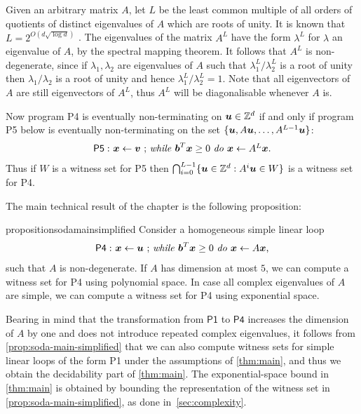 Given an arbitrary matrix $A$, let $L$ be the least common multiple of all orders of quotients of distinct eigenvalues of $A$ which are roots
of unity. It is known that $L=2^{O(d\sqrt{\log d})}$ \cite{BOOK}.  The
eigenvalues of the matrix $A^L$ have the form $\lambda^L$ for
$\lambda$ an eigenvalue of $A$, by the spectral mapping theorem.  It follows that
$A^L$ is non-degenerate, since if $\lambda_1,\lambda_2$ are
eigenvalues of $A$ such that $\lambda^L_1/\lambda^L_2$ is a root of
unity then $\lambda_1/\lambda_2$ is a root of unity and hence
$\lambda^L_1/\lambda^L_2=1$. Note that all eigenvectors of $A$ are still eigenvectors of $A^L$, thus $A^L$ will be diagonalisable whenever $A$ is.

Now program \textsf{P4} is eventually non-terminating on
$\boldsymbol{u}\in \mathbb{Z}^{d}$ if and only if program \textsf{P5}
below is eventually non-terminating on the set
$\{\boldsymbol{u},A\boldsymbol{u}, \ldots,A^{L-1}\boldsymbol{u}\}$:
\begin{gather*}
\mathsf{P5:}\ \mbox{$\boldsymbol{x}\gets \boldsymbol{v}$ ;
\textit{while} $\boldsymbol b^T\boldsymbol{x} \geq 0$ \textit{do} $\boldsymbol{x}\leftarrow A^L\boldsymbol{x}$.}
\end{gather*}
Thus if $W$ is a witness set for \textsf{P5} then $\bigcap_{i=0}^{L-1}
\{ \boldsymbol{u} \in \mathbb{Z}^{d} : A^i\boldsymbol{u} \in W\}$ is a witness set for
\textsf{P4}.

The main technical result of the chapter is the following proposition:
\begin{restatable}{proposition}{sodamainsimplified}
\label{prop:soda-main-simplified}
Consider a homogeneous simple linear loop
\begin{gather*}
\mathsf{P4:}\ \mbox{$\boldsymbol{x}\gets \boldsymbol{u}$ ;
\textit{while} $\boldsymbol{b}^T\boldsymbol{x} \geq 0$ \textit{do} $\boldsymbol{x}\leftarrow A\boldsymbol{x}$,}
\end{gather*}
such that $A$ is non-degenerate. If $A$ has dimension at most $5$, we can compute a witness set for \textsf{P4} using polynomial space.
In case all complex eigenvalues of $A$ are simple, we can compute a witness set for \textsf{P4} using exponential space.
\end{restatable}

Bearing in mind that the transformation from $\mathsf{P1}$ to
$\mathsf{P4}$ increases the dimension of $A$ by one and does not
introduce repeated complex eigenvalues, it follows from
\cref{prop:soda-main-simplified} that we can also compute witness sets for
simple linear loops of the form \textsf{P1}
under the assumptions of \cref{thm:main}, and thus we obtain
the decidability part of \cref{thm:main}.  The
exponential-space bound in \cref{thm:main} is obtained by
bounding the representation of the witness set in
\cref{prop:soda-main-simplified}, as done in~\cref{sec:complexity}.

